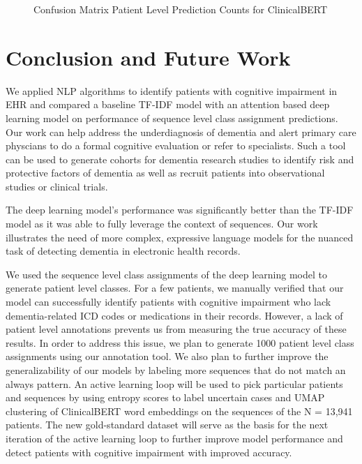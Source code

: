 \documentclass[pmlr,twocolumn,10pt]{jmlr} %
\begin{document}
\begin{figure}[htb]
\caption{Confusion Matrix Patient Level Prediction Counts for ClinicalBERT}
\end{figure}

\section{Conclusion and Future Work} 
\label{sec:ConclusionFutureWork} We applied NLP algorithms to identify patients with cognitive impairment in EHR and compared a baseline TF-IDF model with an attention based deep learning model on performance of sequence level class assignment predictions. Our work can help address the underdiagnosis of dementia and alert primary care physcians to do a formal cognitive evaluation or refer to specialists. Such a tool can be used to generate cohorts for dementia research studies to identify risk and protective factors of dementia as well as recruit patients into observational studies or clinical trials. 

The deep learning model's performance was significantly better than the TF-IDF model as it was able to fully leverage the context of sequences. Our work illustrates the need of more complex, expressive language models for the nuanced task of detecting dementia in electronic health records.

We used the sequence level class assignments of the deep learning model to generate patient level classes. For a few patients, we manually verified that our model can successfully identify patients with cognitive impairment who lack dementia-related ICD codes or medications in their records. However, a lack of patient level annotations prevents us from measuring the true accuracy of these results. In order to address this issue, we plan to generate 1000 patient level class assignments using our annotation tool. We also plan to further improve the generalizability of our models by labeling more sequences that do not match an always pattern. An active learning loop will be used to pick particular patients and sequences by using entropy scores to label uncertain cases and UMAP clustering \citep{mcinnes2018umap} of ClinicalBERT word embeddings on the sequences of the N = 13,941 patients. The new gold-standard dataset will serve as the basis for the next iteration of the active learning loop to further improve model performance and detect patients with cognitive impairment with improved accuracy.
\end{document}

